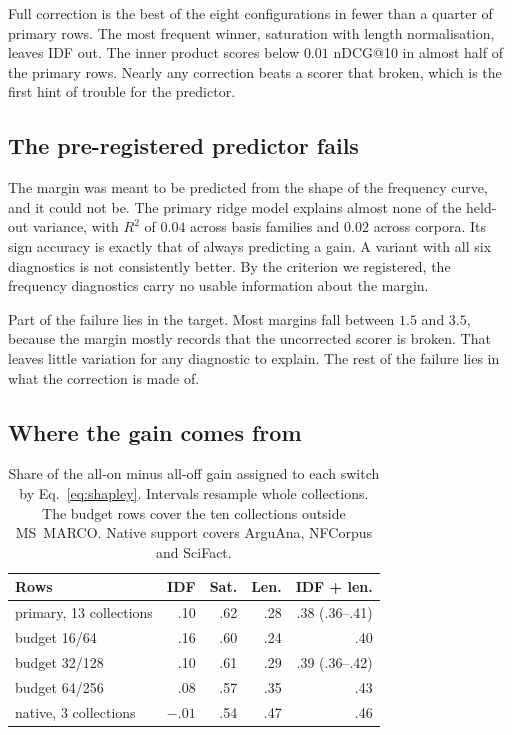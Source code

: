 \documentclass[11pt]{article}
\begin{document}
Full correction is the best of the eight configurations in
fewer than a quarter of primary rows. The most frequent winner, saturation with length
normalisation, leaves IDF out. The inner product scores below $0.01$ nDCG@10 in almost half
of the primary rows. Nearly any correction beats a scorer that broken, which is the first
hint of trouble for the predictor.

\subsection{The pre-registered predictor fails}

The margin was meant to be predicted from the shape of the frequency curve, and it could
not be. The primary ridge model explains almost none of the held-out variance, with $R^2$ of
$0.04$ across basis families and $0.02$ across corpora. Its sign accuracy is exactly that
of always predicting a gain. A variant with all six diagnostics is not consistently better. By the
criterion we registered, the frequency diagnostics carry no usable information about the
margin.

Part of the failure lies in the target. Most margins fall between $1.5$ and $3.5$, because
the margin mostly records that the uncorrected scorer is broken. That leaves little
variation for any diagnostic to explain. The rest of the failure lies in what the
correction is made of.

\subsection{Where the gain comes from}
\label{sec:attribution}

\begin{table}[t]
\centering
\small
\setlength{\tabcolsep}{4pt}
\begin{tabular}{@{}lrrrr@{}}
\toprule
Rows & IDF & Sat. & Len. & IDF + len. \\
\midrule
primary, 13 collections & .10 & .62 & .28 & .38 (.36--.41) \\
\midrule
budget 16/64 & .16 & .60 & .24 & .40 \\
budget 32/128 & .10 & .61 & .29 & .39 (.36--.42) \\
budget 64/256 & .08 & .57 & .35 & .43 \\
native, 3 collections & $-.01$ & .54 & .47 & .46 \\
\bottomrule
\end{tabular}
\caption{Share of the all-on minus all-off gain assigned to each switch by
Eq.~\eqref{eq:shapley}. Intervals resample whole collections. The budget rows cover the
ten collections outside MS~MARCO. Native support covers ArguAna, NFCorpus and SciFact.}
\label{tab:shapley}
\end{table}
\end{document}
